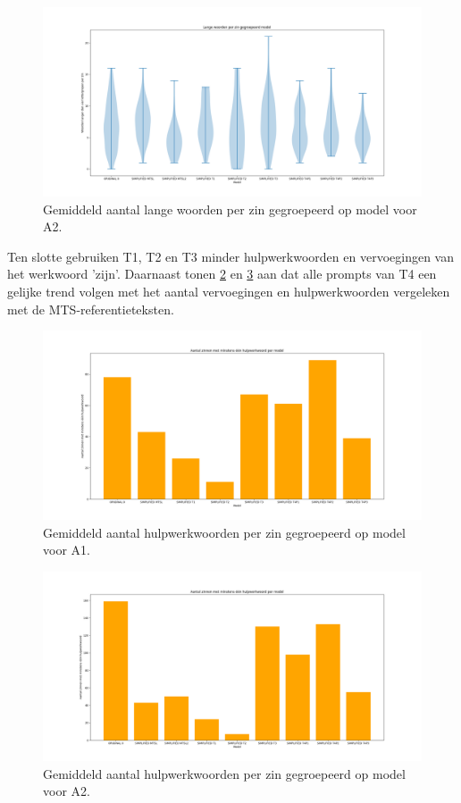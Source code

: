 \begin{figure}
	\includegraphics[width=\linewidth]{img/violinplot-long-a2.png}
	\caption{Gemiddeld aantal lange woorden per zin gegroepeerd op model voor A2.}
	\label{img:violinplot-long-a2}
\end{figure}

Ten slotte gebruiken T1, T2 en T3 minder hulpwerkwoorden en vervoegingen van het werkwoord 'zijn'. Daarnaast tonen \ref{img:histplot-aux-a1} en \ref{img:histplot-aux-a2} aan dat alle prompts van T4 een gelijke trend volgen met het aantal vervoegingen en hulpwerkwoorden vergeleken met de MTS-referentieteksten.

\begin{figure}
	\includegraphics[width=\linewidth]{img/boxplot-aux-a1.png}
	\caption{Gemiddeld aantal hulpwerkwoorden per zin gegroepeerd op model voor A1.}
	\label{img:histplot-aux-a1}
\end{figure}

\begin{figure}
	\includegraphics[width=\linewidth]{img/boxplot-aux-a2.png}
	\caption{Gemiddeld aantal hulpwerkwoorden per zin gegroepeerd op model voor A2.}
	\label{img:histplot-aux-a2}
\end{figure}

